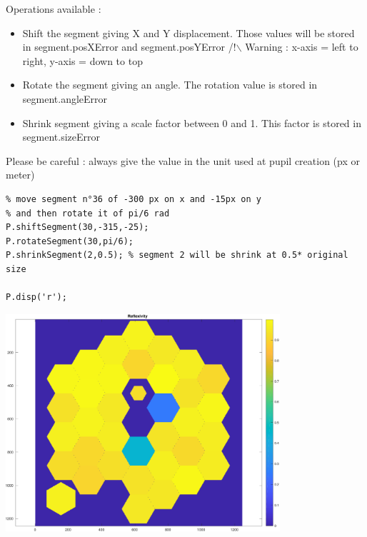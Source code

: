 \documentclass[12pt]{article}
\begin{document}
\begin{par}
Operations available :
\end{par} \vspace{1em}
\begin{itemize}
\setlength{\itemsep}{-1ex}
   \item Shift the segment giving X and Y displacement. Those values will be stored in segment.posXError and segment.posYError /!\ensuremath{\backslash} Warning : x-axis = left to right, y-axis = down to top
\end{itemize}
\begin{itemize}
\setlength{\itemsep}{-1ex}
   \item Rotate the segment giving an angle. The rotation value is stored in  segment.angleError
\end{itemize}
\begin{itemize}
\setlength{\itemsep}{-1ex}
   \item Shrink segment giving a scale factor between 0 and 1. This factor is stored in segment.sizeError
\end{itemize}
\begin{par}
Please be careful : always give the value in the unit used at pupil creation (px or meter)
\end{par} \vspace{1em}
\begin{verbatim}
% move segment n°36 of -300 px on x and -15px on y
% and then rotate it of pi/6 rad
P.shiftSegment(30,-315,-25);
P.rotateSegment(30,pi/6);
P.shrinkSegment(2,0.5); % segment 2 will be shrink at 0.5* original size

P.disp('r');
\end{verbatim}

\includegraphics [width=4in]{docuPupilClass_11.pdf}
\end{document}
